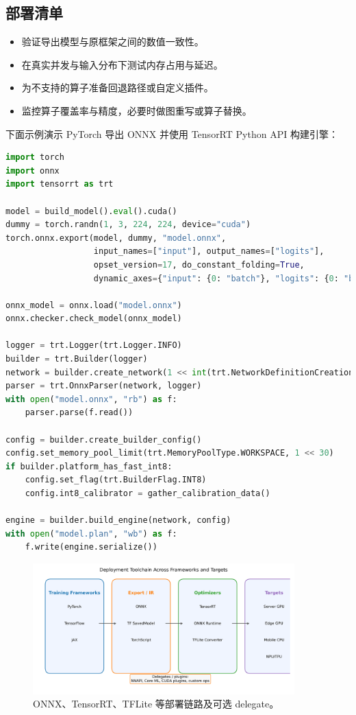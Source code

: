 \documentclass[UTF8,zihao=-4]{ctexart}
\begin{document}
\subsection{部署清单}
\begin{itemize}
  \item 验证导出模型与原框架之间的数值一致性。
  \item 在真实并发与输入分布下测试内存占用与延迟。
  \item 为不支持的算子准备回退路径或自定义插件。
  \item 监控算子覆盖率与精度，必要时做图重写或算子替换。
\end{itemize}
下面示例演示 PyTorch 导出 ONNX 并使用 TensorRT Python API 构建引擎：

\begin{lstlisting}[language=Python, caption={PyTorch 导出 ONNX 并构建 TensorRT 引擎示例。}]
import torch
import onnx
import tensorrt as trt

model = build_model().eval().cuda()
dummy = torch.randn(1, 3, 224, 224, device="cuda")
torch.onnx.export(model, dummy, "model.onnx",
                  input_names=["input"], output_names=["logits"],
                  opset_version=17, do_constant_folding=True,
                  dynamic_axes={"input": {0: "batch"}, "logits": {0: "batch"}})

onnx_model = onnx.load("model.onnx")
onnx.checker.check_model(onnx_model)

logger = trt.Logger(trt.Logger.INFO)
builder = trt.Builder(logger)
network = builder.create_network(1 << int(trt.NetworkDefinitionCreationFlag.EXPLICIT_BATCH))
parser = trt.OnnxParser(network, logger)
with open("model.onnx", "rb") as f:
    parser.parse(f.read())

config = builder.create_builder_config()
config.set_memory_pool_limit(trt.MemoryPoolType.WORKSPACE, 1 << 30)
if builder.platform_has_fast_int8:
    config.set_flag(trt.BuilderFlag.INT8)
    config.int8_calibrator = gather_calibration_data()

engine = builder.build_engine(network, config)
with open("model.plan", "wb") as f:
    f.write(engine.serialize())
\end{lstlisting}

\begin{figure}[H]
  \centering
  \includegraphics[width=0.9\textwidth]{deployment_toolchain.png}
  \caption{ONNX、TensorRT、TFLite 等部署链路及可选 delegate。}
  \label{fig:deployment_toolchain_cn}
\end{figure}
\FloatBarrier
\end{document}
